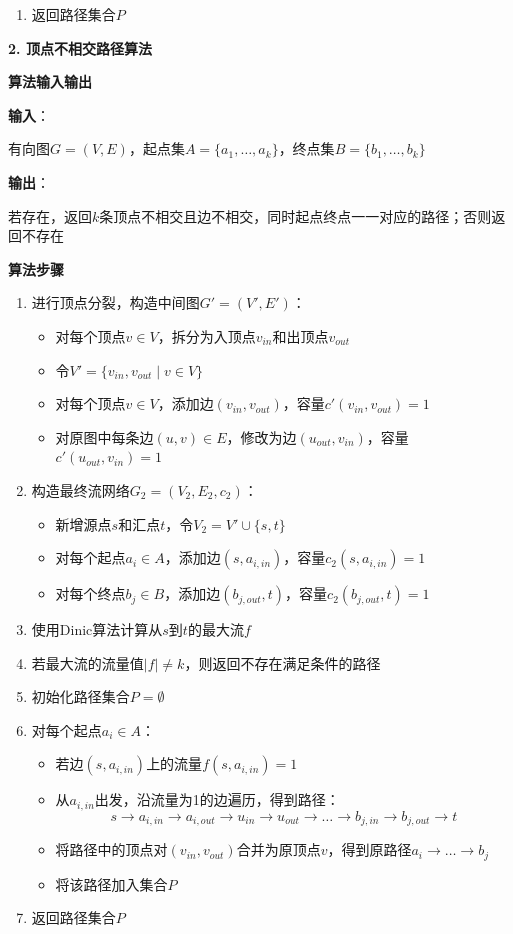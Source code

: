 \documentclass{article}
\newcommand{\<}{
    \langle}
\renewcommand{\>}{
    \rangle}
\begin{document}
{\begin{enumerate}
    \item 返回路径集合$P$
\end{enumerate}

\noindent\textbf{2. 顶点不相交路径算法}

\noindent\textbf{算法输入输出}

\textbf{输入}：

有向图$G=(V,E)$，起点集$A=\{a_1,\dots,a_k\}$，终点集$B=\{b_1,\dots,b_k\}$

\textbf{输出}：

若存在，返回$k$条顶点不相交且边不相交，同时起点终点一一对应的路径；否则返回不存在

\noindent\textbf{算法步骤}
\begin{enumerate}
    \item 进行顶点分裂，构造中间图$G'=(V',E')$：
    \begin{itemize}
        \item 对每个顶点$v \in V$，拆分为入顶点$v_{in}$和出顶点$v_{out}$
        \item 令$V' = \{v_{in}, v_{out} \mid v \in V\}$
        \item 对每个顶点$v \in V$，添加边$(v_{in},v_{out})$，容量$c'(v_{in},v_{out})=1$
        \item 对原图中每条边$(u,v) \in E$，修改为边$(u_{out},v_{in})$，容量$c'(u_{out},v_{in})=1$
    \end{itemize}
    
    \item 构造最终流网络$G_2=(V_2,E_2,c_2)$：
    \begin{itemize}
        \item 新增源点$s$和汇点$t$，令$V_2 = V' \cup \{s, t\}$
        \item 对每个起点$a_i \in A$，添加边$(s,a_{i,in})$，容量$c_2(s,a_{i,in})=1$
        \item 对每个终点$b_j \in B$，添加边$(b_{j,out},t)$，容量$c_2(b_{j,out},t)=1$
    \end{itemize}
    
    \item 使用Dinic算法计算从$s$到$t$的最大流$f$
    
    \item 若最大流的流量值$|f| \neq k$，则返回不存在满足条件的路径
    
    \item 初始化路径集合$P = \emptyset$
    
    \item 对每个起点$a_i \in A$：
    \begin{itemize}
        \item 若边$(s,a_{i,in})$上的流量$f(s,a_{i,in}) = 1$
        \item 从$a_{i,in}$出发，沿流量为1的边遍历，得到路径：
        \[ s \to a_{i,in} \to a_{i,out} \to u_{in} \to u_{out} \to \dots \to b_{j,in} \to b_{j,out} \to t \]
        \item 将路径中的顶点对$(v_{in},v_{out})$合并为原顶点$v$，得到原路径$a_i \to \dots \to b_j$
        \item 将该路径加入集合$P$
    \end{itemize}
    
    \item 返回路径集合$P$
\end{enumerate}



}
\end{document}
